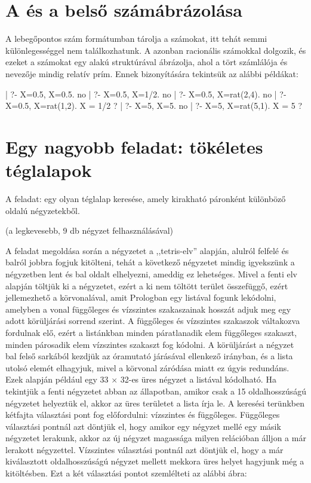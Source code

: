\section{A \clpq és a \clpr belső számábrázolása}

A \clpr lebegőpontos szám formátumban tárolja a számokat, itt tehát
semmi különlegességgel nem találkozhatunk. A \clpq azonban racionális
számokkal dolgozik, és ezeket a számokat egy 
alakú struktúrával ábrázolja, ahol a tört számlálója és nevezője mindig
relatív prím. Ennek bizonyítására tekintsük az alábbi \clpq példákat:

\begin{prologcode}
| ?- {X=0.5}, X=0.5.
no
| ?- {X=0.5}, X=1/2.
no
| ?- {X=0.5}, X=rat(2,4).
no
| ?- {X=0.5}, X=rat(1,2).
X = 1/2 ?
| ?- {X=5}, X=5.
no
| ?- {X=5}, X=rat(5,1).
X = 5 ?
\end{prologcode}

\section{Egy nagyobb \clpq feladat: tökéletes téglalapok}

\label{teglalap:clpqr}

A feladat: egy olyan téglalap keresése, amely kirakható páronként különböző
oldalú négyzetekből.

(a legkevesebb, 9 db négyzet felhasználásával)
\begin{center}
\end{center}

A feladat megoldása során a négyzetet a ,,tetris-elv'' alapján, alulról
felfelé és balról jobbra fogjuk kitölteni, tehát a következő négyzetet
mindig igyekszünk a négyzetben lent és bal oldalt elhelyezni, ameddig
ez lehetséges. Mivel a fenti elv alapján töltjük ki a négyzetet, ezért a
ki nem töltött terület összefüggő, ezért jellemezhető a körvonalával, amit
Prologban egy listával fogunk lekódolni, amelyben a vonal függőleges és
vízszintes szakaszainak hosszát adjuk meg egy adott körüljárási sorrend
szerint. A függőleges és vízszintes szakaszok váltakozva fordulnak elő,
ezért a listánkban minden páratlanadik elem függőleges szakaszt, minden
párosadik elem vízszintes szakaszt fog kódolni. A körüljárást a négyzet
bal felső sarkából kezdjük az óramutató járásával ellenkező irányban, és
a lista utolsó elemét elhagyjuk, mivel a körvonal záródása miatt ez úgyis
redundáns. Ezek alapján például egy 33 $\times$ 32-es üres négyzet a
\cd{[-32,33,32]} listával kódolható. Ha tekintjük a fenti négyzetet abban
az állapotban, amikor csak a 15 oldalhosszúságú négyzetet helyeztük el,
akkor az üres területet a \cd{[-17,15,-15,18,32]} lista írja le.
\br
A keresési terünkben kétfajta választási pont fog előfordulni: vízszintes
és függőleges. Függőleges választási pontnál azt döntjük el, hogy amikor
egy négyzet mellé egy másik négyzetet lerakunk, akkor az új négyzet magassága
milyen relációban álljon a már lerakott négyzettel. Vízszintes választási
pontnál azt döntjük el, hogy a már kiválasztott oldalhosszúságú négyzet
mellett mekkora üres helyet hagyjunk még a kitöltésben. Ezt a két választási
pontot szemlélteti az alábbi ábra:

